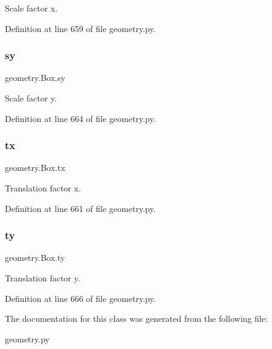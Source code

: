 Scale factor x. 



Definition at line 659 of file geometry.\+py.

\mbox{\label{classgeometry_1_1Box_a223765001a3661705685ed85647a54ff}} 
\subsubsection{\texorpdfstring{sy}{sy}}
{\footnotesize\ttfamily geometry.\+Box.\+sy}



Scale factor y. 



Definition at line 664 of file geometry.\+py.

\mbox{\label{classgeometry_1_1Box_a0e744b5244823afefa01b40c2613037f}} 
\subsubsection{\texorpdfstring{tx}{tx}}
{\footnotesize\ttfamily geometry.\+Box.\+tx}



Translation factor x. 



Definition at line 661 of file geometry.\+py.

\mbox{\label{classgeometry_1_1Box_aca0410b99a6d8b59060f6fcbf12db160}} 
\subsubsection{\texorpdfstring{ty}{ty}}
{\footnotesize\ttfamily geometry.\+Box.\+ty}



Translation factor y. 



Definition at line 666 of file geometry.\+py.



The documentation for this class was generated from the following file\+:\begin{DoxyCompactItemize}
\item 
geometry.\+py\end{DoxyCompactItemize}
